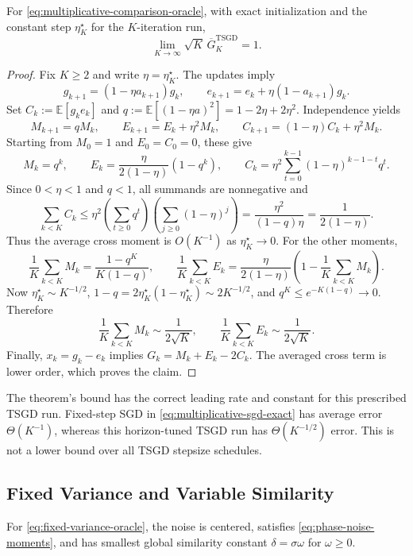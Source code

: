 \begin{lemma}
\label{lem:multiplicative-tsgd-tuned-exact}
For \eqref{eq:multiplicative-comparison-oracle}, with exact
initialization and the constant step $\eta_K^\star$ for the
$K$-iteration run,
\[
\lim_{K\to\infty}\sqrt K\,\overline G_K^{\mathrm{TSGD}}=1.
\]
\end{lemma}

\begin{proof}
Fix $K\geq2$ and write $\eta=\eta_K^\star$. The updates imply
\[
g_{k+1}=(1-\eta a_{k+1})g_k,\qquad
e_{k+1}=e_k+\eta(1-a_{k+1})g_k.
\]
Set $C_k:=\mathbb E[g_ke_k]$ and
$q:=\mathbb E[(1-\eta a)^2]=1-2\eta+2\eta^2$.
Independence yields
\[
M_{k+1}=qM_k,\qquad E_{k+1}=E_k+\eta^2M_k,
\qquad C_{k+1}=(1-\eta)C_k+\eta^2M_k.
\]
Starting from $M_0=1$ and $E_0=C_0=0$, these give
\[
M_k=q^k,\qquad E_k=\frac{\eta}{2(1-\eta)}(1-q^k),\qquad
C_k=\eta^2\sum_{t=0}^{k-1}(1-\eta)^{k-1-t}q^t.
\]
Since $0<\eta<1$ and $q<1$, all summands are nonnegative and
\[
\sum_{k<K}C_k
\leq\eta^2\left(\sum_{t\geq0}q^t\right)
             \left(\sum_{j\geq0}(1-\eta)^j\right)
=\frac{\eta^2}{(1-q)\eta}
=\frac1{2(1-\eta)}.
\]
Thus the average cross moment is $O(K^{-1})$ as
$\eta_K^\star\to0$. For the other moments,
\[
\frac1K\sum_{k<K}M_k=\frac{1-q^K}{K(1-q)},\qquad
\frac1K\sum_{k<K}E_k=
\frac{\eta}{2(1-\eta)}
\left(1-\frac1K\sum_{k<K}M_k\right).
\]
Now $\eta_K^\star\sim K^{-1/2}$,
$1-q=2\eta_K^\star(1-\eta_K^\star)\sim2K^{-1/2}$, and
$q^K\leq e^{-K(1-q)}\to0$. Therefore
\[
\frac1K\sum_{k<K}M_k\sim\frac1{2\sqrt K},\qquad
\frac1K\sum_{k<K}E_k\sim\frac1{2\sqrt K}.
\]
Finally, $x_k=g_k-e_k$ implies
$G_k=M_k+E_k-2C_k$. The averaged cross term is lower order,
which proves the claim.
\end{proof}

The theorem's bound has the correct leading rate and constant for
this prescribed TSGD run. Fixed-step SGD in
\eqref{eq:multiplicative-sgd-exact} has average error
$\Theta(K^{-1})$, whereas this horizon-tuned TSGD run has
$\Theta(K^{-1/2})$ error. This is not a lower bound over all TSGD
stepsize schedules.

\subsection{Fixed Variance and Variable Similarity}
\label{app:sinusoidal-proof}

\begin{lemma}
\label{lem:fixed-variance-variable-similarity}
For \eqref{eq:fixed-variance-oracle}, the noise is centered, satisfies
\eqref{eq:phase-noise-moments}, and has smallest global similarity
constant $\delta=\sigma\omega$ for $\omega\geq0$.
\end{lemma}

